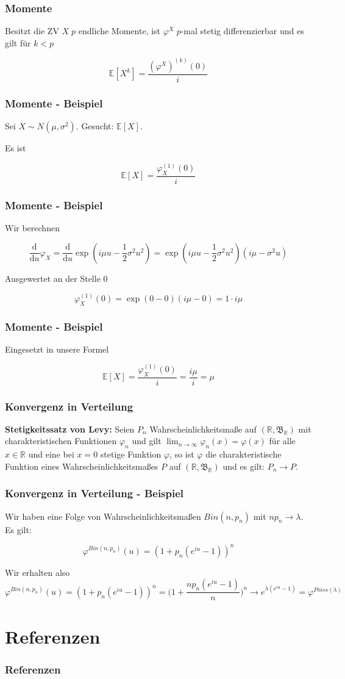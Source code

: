 \documentclass{beamer}
\newcommand{\R}{\mathbb{R}}
\newcommand{\E}{\mathbb{E}}
\newcommand\dint{\mathord{\mathrm{d}}}
\begin{document}
\begin{frame}
\frametitle{Momente}
Besitzt die ZV $X \; p$ endliche Momente, ist $\varphi^X \; p$-mal stetig differenzierbar und es gilt für $k < p$

\begin{equation*}
\E[X^k] = \frac{(\varphi^X)^{(k)}(0)}{i}
\end{equation*}
\end{frame}

\begin{frame}
\frametitle{Momente - Beispiel}
Sei $X \sim N(\mu, \sigma^2)$. Gesucht: $\E[X]$.

Es ist

$$\E[X] = \frac{\varphi_X^{(1)}(0)}{i}$$
\end{frame}

\begin{frame}
\frametitle{Momente - Beispiel}
Wir berechnen

$$\frac{\dint}{\dint u} \varphi_X = \frac{\dint}{\dint u} \exp(i \mu u - \frac{1}{2} \sigma^2 u^2) = \exp(i \mu u - \frac{1}{2} \sigma^2 u^2) (i \mu - \sigma^2 u)$$

Ausgewertet an der Stelle 0

$$\varphi_X^{(1)}(0) = \exp(0 - 0) (i \mu - 0) = 1 \cdot i \mu$$
\end{frame}

\begin{frame}
\frametitle{Momente - Beispiel}
Eingesetzt in unsere Formel

$$\E[X] = \frac{\varphi_X^{(1)}(0)}{i} = \frac{i \mu}{i} = \mu$$
\end{frame}

\begin{frame}
\frametitle{Konvergenz in Verteilung}
\textbf{Stetigkeitssatz von Levy:} \hfill \newline
Seien $P_n$ Wahrscheinlichkeitsmaße auf $(\R, \mathfrak{B}_\R)$ mit charakteristischen Funktionen $\varphi_n$ und gilt $\lim_{n \to \infty} \varphi_n (x) = \varphi(x)$ für alle $x \in \R$ und eine bei $x = 0$ stetige Funktion $\varphi$, so ist $\varphi$ die charakteristische Funktion eines Wahrscheinlichkeitsmaßes $P$ auf $(\R, \mathfrak{B}_\R)$ und es gilt: $P_n \to P$.
\end{frame}

\begin{frame}
\frametitle{Konvergenz in Verteilung - Beispiel}
Wir haben eine Folge von Wahrscheinlichkeitsmaßen $Bin(n, p_n)$ mit $np_n \to \lambda$. Es gilt:

$$\varphi^{Bin(n, p_n)}(u) = (1 + p_n(e^{iu} - 1))^n$$

Wir erhalten also
{\footnotesize
$$\varphi^{Bin(n, p_n)}(u) = (1 + p_n(e^{iu} - 1))^n = \Bigg(1 + \frac{np_n(e^{iu} - 1)}{n}\Bigg)^n \to e^{\lambda(e^{iu}-1)} = \varphi^{Poiss(\lambda)}$$
}%
\end{frame}



\section*{Referenzen}


\begin{frame}
\frametitle{Referenzen}
\nocite{*}
\printbibliography
\end{frame}
\end{document}
